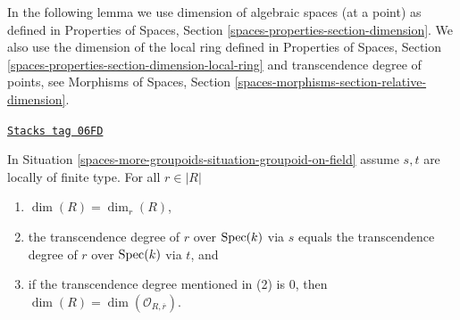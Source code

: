 In the following lemma we use dimension of algebraic spaces (at a point)
as defined in
Properties of Spaces, Section \ref{spaces-properties-section-dimension}.
We also use the dimension of the local ring defined in
Properties of Spaces, Section
\ref{spaces-properties-section-dimension-local-ring}
and transcendence degree of points, see
Morphisms of Spaces, Section \ref{spaces-morphisms-section-relative-dimension}.

\begin{lemma}
\label{spaces-more-groupoids-lemma-groupoid-on-field-locally-finite-type-dimension}
\href{https://stacks.math.columbia.edu/tag/06FD}{\texttt{Stacks tag 06FD}}

In
Situation \ref{spaces-more-groupoids-situation-groupoid-on-field}
assume $s, t$ are locally of finite type.
For all $r \in |R|$
\begin{enumerate}
\item $\dim(R) = \dim_r(R)$,
\item the transcendence degree of $r$ over $\operatorname{Spec}(k)$
via $s$ equals the transcendence degree of $r$ over $\operatorname{Spec}(k)$
via $t$, and
\item if the transcendence degree mentioned in (2) is $0$, then
$\dim(R) = \dim(\mathcal{O}_{R, \overline{r}})$.
\end{enumerate}
\end{lemma}

